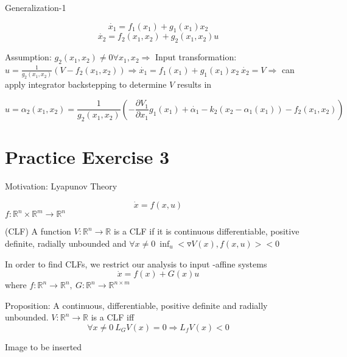Generalization-1

\begin{equation*}
\dot{x_1} = f_1(x_1) + g_1(x_1)x_2
\end{equation*}
\begin{equation*}
\dot{x_2} = f_2(x_1, x_2) + g_2(x_1,x_2)u
\end{equation*}

Assumption: $g_2(x_1, x_2) \neq 0 \forall x_1, x_2 \Rightarrow $ Input transformation: $u = \frac{1}{g_2(x_1, x_2)}(V - f_2(x_1, x_2)) \Rightarrow \dot{x_1} = f_1(x_1) + g_1(x_1)x_2 \ \dot{x_2} = V \Rightarrow $ can apply integrator backstepping to determine $V$ results in 

\begin{equation*}
u = \alpha_2(x_1, x_2) = \frac{1}{g_2(x_1,x_2)}(-\frac{\partial V_1}{\partial x_1}g_1(x_1) + \dot{\alpha_1} - k_2(x_2 - \alpha_1(x_1)) - f_2(x_1, x_2))
\end{equation*} 

\section{Practice Exercise 3}

Motivation: Lyapunov Theory

\begin{equation*}
\dot{x} = f(x,u)
\end{equation*}
$f:\mathbb{R}^n \times \mathbb{R}^m \to \mathbb{R}^n$

\begin{Definition}
(CLF) A function $V: \mathbb{R}^n \to \mathbb{R}$ is a CLF if it is continuous differentiable, positive definite, radially unbounded and $ \forall x \neq 0 \ \inf_{u}< \triangledown V(x), f(x,u) > < 0$ 
\end{Definition}

In order to find CLFs, we restrict our analysis to input -affine systems
\begin{equation*}
\dot{x} = f(x) + G(x)u
\end{equation*}
where $f: \mathbb{R}^n \to \mathbb{R}^n, \ G: \mathbb{R}^n \to \mathbb{R}^{n \times m}$

Proposition: A continuous, differentiable, positive definite and radially unbounded. $V: \mathbb{R}^n \to \mathbb{R}$ is a CLF iff 
\begin{equation*}
\forall x \neq 0 \ L_GV(x) = 0 \Rightarrow L_fV(x) < 0
\end{equation*}

Image to be inserted

